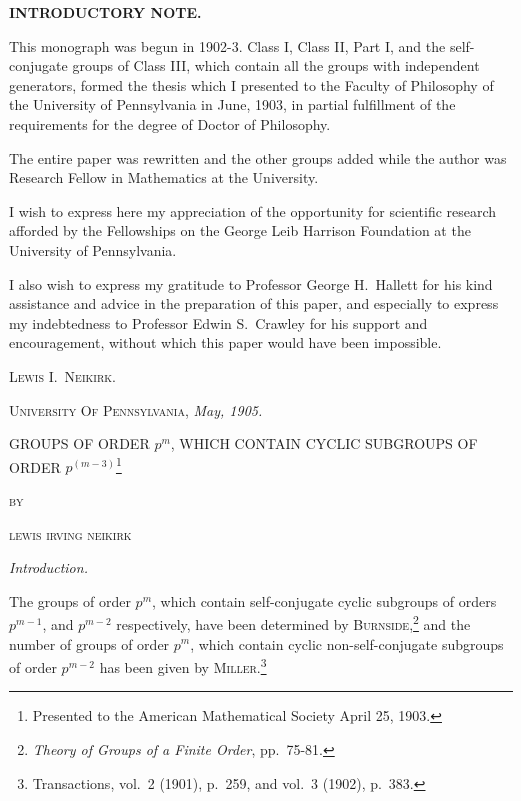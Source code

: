 \documentclass[oneside]{article}
\begin{document}
\newpage
\begin{center}
\large \textbf{INTRODUCTORY NOTE.}
\end{center}
\normalsize

This monograph was begun in 1902-3. Class I, Class II, Part I, and
the self-conjugate groups of Class III, which contain all the groups with
independent generators, formed the thesis which I presented to the Faculty
of Philosophy of the University of Pennsylvania in June, 1903, in partial
fulfillment of the requirements for the degree of Doctor of Philosophy.

The entire paper was rewritten and the other groups added while the
author was Research Fellow in Mathematics at the University.

I wish to express here my appreciation of the opportunity for scientific
research afforded by the Fellowships on the George Leib Harrison Foundation
at the University of Pennsylvania.

I also wish to express my gratitude to Professor George H.\
Hallett for his kind assistance and advice in the preparation of
this paper, and especially to express my indebtedness to Professor
Edwin S.\ Crawley for his support and encouragement, without which
this paper would have been impossible.

\begin{flushright}
\textsc{Lewis I.\ Neikirk.}
\end{flushright}

\footnotesize \textsc{ University Of Pennsylvania,} \textit{May,
1905.} \normalsize

\newpage

\begin{center}
\large GROUPS OF ORDER $p^m$, WHICH CONTAIN CYCLIC SUBGROUPS OF
ORDER $p^{(m-3)}$\footnote{Presented to the American Mathematical
Society April 25, 1903.}

\bigskip \normalsize \textsc{by}

\bigskip \textsc{lewis irving neikirk}

\bigskip\textit{Introduction.}
\end{center}

The groups of order $p^m$, which contain self-conjugate cyclic
subgroups of orders $p^{m-1}$, and $p^{m-2}$ respectively, have
been determined by \textsc{Burnside},\footnote{\textit{Theory of
Groups of a Finite Order}, pp.\ 75-81.} and the number of groups of
order $p^m$, which contain cyclic non-self-conjugate subgroups of
order $p^{m-2}$ has been given by
\textsc{Miller}.\footnote{Transactions, vol.\ 2 (1901), p.\ 259, and
vol.\ 3 (1902), p.\ 383.}
\end{document}
